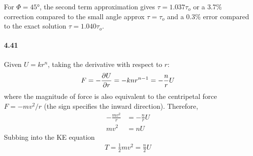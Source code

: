 \documentclass[../problems.tex]{subfiles}
\begin{document}
For $\Phi = \ang{45}$, the second term approximation gives $\tau = 1.037\tau_o$ or a 3.7\%
correction compared to the small angle approx $\tau = \tau_o$ and a 0.3\% error compared to the
exact solution $\tau = 1.040\tau_o$.

\paragraph{4.41}
Given $U = kr^n$, taking the derivative with respect to $r$:
\begin{align*}
    F = - \pdv{U}{r} = - kn r^{n-1} = - \frac{n}{r} U
\end{align*}
where the magnitude of force is also equivalent to the centripetal force $F = -mv^2/r$ (the sign
specifies the inward direction). Therefore,
\begin{align*}
    -\frac{mv^2}{r} &= -\frac{n}{r} U \\
    mv^2 &= n U
\end{align*}
Subbing into the KE equation
\begin{align*}
    T = \frac{1}{2} mv^2 = \frac{n}{2} U
\end{align*}
\end{document}
